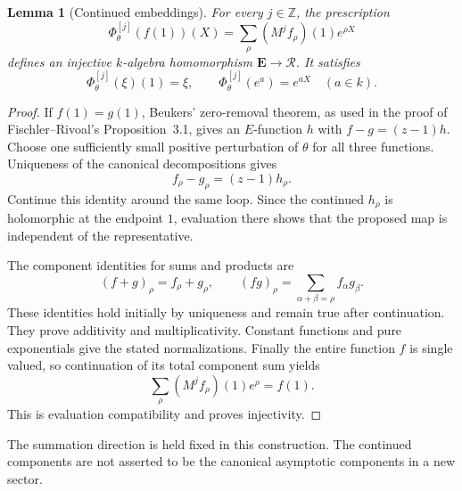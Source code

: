 \documentclass[11pt]{article}
\newtheorem{lemma}[theorem]{Lemma}
\theoremstyle{definition}
\theoremstyle{remark}
\newcommand{\E}{\mathbf E}
\begin{document}
\begin{lemma}[Continued embeddings]\label{mbc:continued}
For every $j\in\mathbb Z$, the prescription
\[
 \Phi_\theta^{[j]}(f(1))(X)
       =\sum_\rho (M^j f_\rho)(1)e^{\rho X}
\]
defines an injective $k$-algebra homomorphism
$\E\longrightarrow\mathcal R$.  It satisfies
\[
 \Phi_\theta^{[j]}(\xi)(1)=\xi,
 \qquad \Phi_\theta^{[j]}(e^a)=e^{aX}\quad(a\in k).
\]
\end{lemma}
\begin{proof}
If $f(1)=g(1)$, Beukers' zero-removal theorem, as used in the proof
of Fischler--Rivoal's Proposition~3.1, gives an $E$-function $h$
with $f-g=(z-1)h$.  Choose one sufficiently small positive
perturbation of $\theta$ for all three functions.  Uniqueness of
the canonical decompositions gives
\[
 f_\rho-g_\rho=(z-1)h_\rho.
\]
Continue this identity around the same loop.  Since the continued
$h_\rho$ is holomorphic at the endpoint $1$, evaluation there
shows that the proposed map is independent of the representative.

The component identities for sums and products are
\[
 (f+g)_\rho=f_\rho+g_\rho,
 \qquad (fg)_\rho=\sum_{\alpha+\beta=\rho}f_\alpha g_\beta.
\]
These identities hold initially by uniqueness and remain true
after continuation.  They prove additivity and multiplicativity.
Constant functions and pure exponentials give the stated
normalizations.  Finally the entire function $f$ is single valued,
so continuation of its total component sum yields
\[
 \sum_\rho(M^j f_\rho)(1)e^\rho=f(1).
\]
This is evaluation compatibility and proves injectivity.
\end{proof}

The summation direction is held fixed in this construction.  The
continued components are not asserted to be the canonical
asymptotic components in a new sector.
\end{document}
